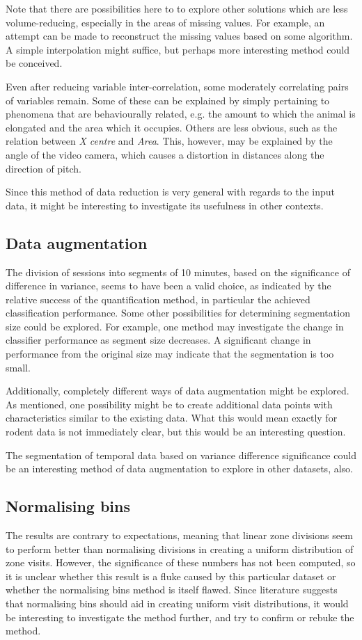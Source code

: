 \documentclass[conference,a4paper,twoside]{IEEEtran}
\begin{document}
Note that there are possibilities here to to explore other solutions which are less volume-reducing, especially in the areas of missing values. For example, an attempt can be made to reconstruct the missing values based on some algorithm. A simple interpolation might suffice, but perhaps more interesting method could be conceived.

Even after reducing variable inter-correlation, some moderately correlating pairs of variables remain. Some of these can be explained by simply pertaining to phenomena that are behaviourally related, e.g. the amount to which the animal is elongated and the area which it occupies. Others are less obvious, such as the relation between \emph{X centre} and \emph{Area}. This, however, may be explained by the angle of the video camera, which causes a distortion in distances along the direction of pitch.

Since this method of data reduction is very general with regards to the input data, it might be interesting to investigate its usefulness in other contexts.

\subsection{Data augmentation}
\label{sec:disc_augment}
The division of sessions into segments of 10 minutes, based on the significance of difference in variance, seems to have been a valid choice, as indicated by the relative success of the quantification method, in particular the achieved classification performance. Some other possibilities for determining segmentation size could be explored. For example, one method may investigate the change in classifier performance as segment size decreases. A significant change in performance from the original size may indicate that the segmentation is too small.

Additionally, completely different ways of data augmentation might be explored. As mentioned, one possibility might be to create additional data points with characteristics similar to the existing data. What this would mean exactly for rodent data is not immediately clear, but this would be an interesting question.

The segmentation of temporal data based on variance difference significance could be an interesting method of data augmentation to explore in other datasets, also.

\subsection{Normalising bins}
The results are contrary to expectations, meaning that linear zone divisions seem to perform better than normalising divisions in creating a uniform distribution of zone visits. However, the significance of these numbers has not been computed, so it is unclear whether this result is a fluke caused by this particular dataset or whether the normalising bins method is itself flawed. Since literature suggests that normalising bins should aid in creating uniform visit distributions, it would be interesting to investigate the method further, and try to confirm or rebuke the method.
\end{document}
